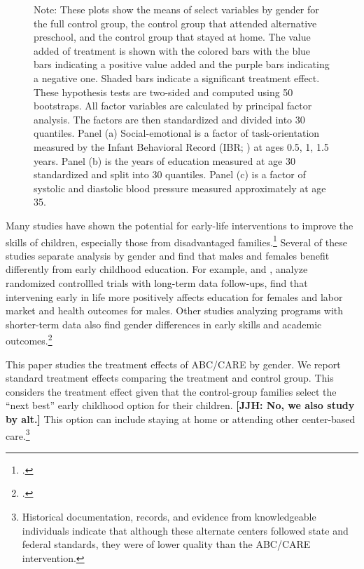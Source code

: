 \begin{figure}[!htbp]
\footnotesize \justify
Note: These plots show the means of select variables by gender for the full control group, the control group that attended alternative preschool, and the control group that stayed at home. The value added of treatment is shown with the colored bars with the blue bars indicating a positive value added and the purple bars indicating a negative one. Shaded bars indicate a significant treatment effect. These hypothesis tests are two-sided and computed using 50 bootstraps. All factor variables are calculated by principal factor analysis. The factors are then standardized and divided into 30 quantiles. Panel (a) Social-emotional is a factor of task-orientation measured by the Infant Behavioral Record (IBR; \citet{Bayley_1969_BSID-Manual}) at ages 0.5, 1, 1.5 years. Panel (b) is the years of education measured at age 30 standardized and split into 30 quantiles. Panel (c) is a factor of systolic and diastolic blood pressure measured approximately at age 35.
\end{figure}

Many studies have shown the potential for early-life interventions to improve the skills of children, especially those from disadvantaged families.\footnote{\citet{Currie_2011_AER,Elango_Hojman_etal_2016_Early-Edu}.} Several of these studies separate analysis by gender and find that males and females benefit differently from early childhood education. For example, \citet{Heckman_Moon_etal_2010_QE} and \citet{Garcia_Heckman_Leaf_etal_2017_Comp_CBA_Unpublished}, analyze randomized controllled trials with long-term data follow-ups, find that intervening early in life more positively affects education for females and labor market and health outcomes for males. Other studies analyzing programs with shorter-term data also find gender differences in early skills and academic outcomes.\footnote{\citet{Deming_2009_AEJAE,Ou_Reynolds_2010_Mechanisms_CYSR,Magnuson_Kelchen_Duncan_etal_2016_ECRQ}.}

This paper studies the treatment effects of ABC/CARE by gender. We report standard treatment effects comparing the treatment and control group. This considers the treatment effect given that the control-group families select the ``next best'' early childhood option for their children. \textbf{[JJH: No, we also study by alt.]} This option can include staying at home or attending other center-based care.\footnote{Historical documentation, records, and evidence from knowledgeable individuals indicate that although these alternate centers followed state and federal standards, they were of lower quality than the ABC/CARE intervention.}

